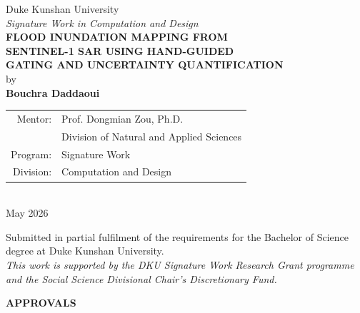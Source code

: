 \documentclass[12pt,oneside]{report}
\begin{document}

\begin{titlepage}
\centering
\vspace*{1.0cm}
{\large Duke Kunshan University}\\[0.3cm]
{\large\itshape Signature Work in Computation and Design}\\[1.8cm]

{\LARGE\bfseries FLOOD INUNDATION MAPPING FROM\\[0.3cm]
SENTINEL-1 SAR USING HAND-GUIDED\\[0.3cm]
GATING AND UNCERTAINTY QUANTIFICATION}\\[2.5cm]

{\large by}\\[0.5cm]
{\large\bfseries Bouchra Daddaoui}\\[1.5cm]

\begin{tabular}{rl}
  Mentor: & Prof. Dongmian Zou, Ph.D.\\
          & Division of Natural and Applied Sciences\\[0.4cm]
  Program: & Signature Work\\
  Division: & Computation and Design
\end{tabular}\\[2.0cm]

{\large May 2026}\\[1.5cm]

\vfill
\begin{minipage}{0.80\textwidth}
\centering
\small
Submitted in partial fulfilment of the requirements for the
Bachelor of Science degree at Duke Kunshan University.\\[0.5em]
\textit{This work is supported by the DKU Signature Work Research Grant
programme and the Social Science Divisional Chair's Discretionary Fund.}
\end{minipage}
\end{titlepage}

\newpage
\thispagestyle{plain}
\begin{center}
  {\large\bfseries APPROVALS}
\end{center}
\vspace{1em}
\end{document}
